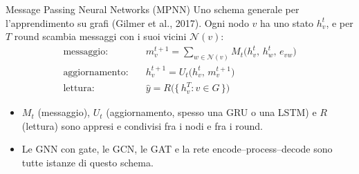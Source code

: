 \documentclass[aspectratio=169]{beamer}
\newcommand{\T}[2]{#2}
\newcommand{\T}[2]{#1}
\begin{document}
\begin{frame}{Message Passing Neural Networks (MPNN)}
  \T{A general framework for learning on graphs (Gilmer et al., 2017). Each node $v$ holds a
  state $h_v^{t}$, and for $T$ rounds it exchanges messages with its neighbors $\mathcal N(v)$:}%
  {Uno schema generale per l'apprendimento su grafi (Gilmer et al., 2017). Ogni nodo $v$ ha uno
  stato $h_v^{t}$, e per $T$ round scambia messaggi con i suoi vicini $\mathcal N(v)$:}
  \begin{align*}
    \text{\T{message:}{messaggio:}}\quad & m_v^{t+1} = \sum_{w\in\mathcal N(v)} M_t\!\big(h_v^{t},\,h_w^{t},\,e_{vw}\big)\\[1mm]
    \text{\T{update:}{aggiornamento:}}\quad  & h_v^{t+1} = U_t\!\big(h_v^{t},\,m_v^{t+1}\big)\\[1mm]
    \text{\T{readout:}{lettura:}}\quad & \hat y = R\big(\{\,h_v^{T} : v\in G\,\}\big)
  \end{align*}
  \begin{itemize}
    \item \T{$M_t$ (message), $U_t$ (update, often a GRU or an LSTM) and $R$ (readout) are
          learned and shared across the nodes and the rounds.}%
          {$M_t$ (messaggio), $U_t$ (aggiornamento, spesso una GRU o una LSTM) e $R$ (lettura)
          sono appresi e condivisi fra i nodi e fra i round.}
    \item \T{Gated GNNs, GCN, GAT and the encode--process--decode network are all instances
          of this template.}%
          {Le GNN con gate, le GCN, le GAT e la rete encode--process--decode sono tutte
          istanze di questo schema.}
  \end{itemize}
\end{frame}
\end{document}

